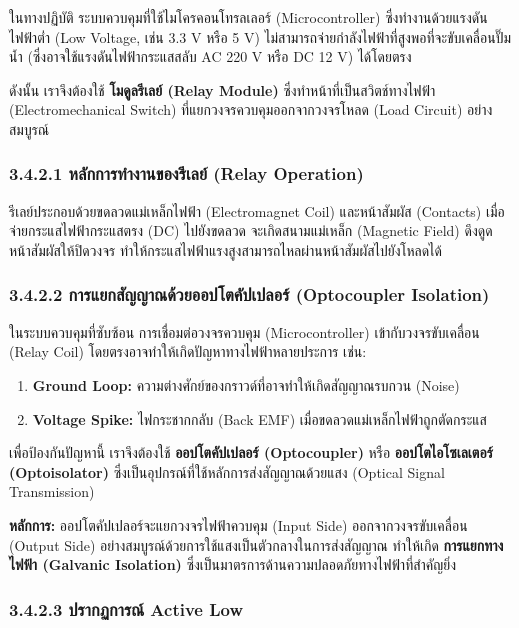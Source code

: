 \documentclass[11pt,a4paper,openany]{report}
\begin{document}
ในทางปฏิบัติ ระบบควบคุมที่ใช้ไมโครคอนโทรลเลอร์ (Microcontroller) ซึ่งทำงานด้วยแรงดันไฟฟ้าต่ำ (Low Voltage, เช่น 3.3 V หรือ 5 V) ไม่สามารถจ่ายกำลังไฟฟ้าที่สูงพอที่จะขับเคลื่อนปั๊มน้ำ (ซึ่งอาจใช้แรงดันไฟฟ้ากระแสสลับ AC 220 V หรือ DC 12 V) ได้โดยตรง

ดังนั้น เราจึงต้องใช้ \textbf{โมดูลรีเลย์ (Relay Module)} ซึ่งทำหน้าที่เป็นสวิตช์ทางไฟฟ้า (Electromechanical Switch) ที่แยกวงจรควบคุมออกจากวงจรโหลด (Load Circuit) อย่างสมบูรณ์

\subsubsection{3.4.2.1 หลักการทำงานของรีเลย์ (Relay Operation)}


รีเลย์ประกอบด้วยขดลวดแม่เหล็กไฟฟ้า (Electromagnet Coil) และหน้าสัมผัส (Contacts) เมื่อจ่ายกระแสไฟฟ้ากระแสตรง (DC) ไปยังขดลวด จะเกิดสนามแม่เหล็ก (Magnetic Field) ดึงดูดหน้าสัมผัสให้ปิดวงจร ทำให้กระแสไฟฟ้าแรงสูงสามารถไหลผ่านหน้าสัมผัสไปยังโหลดได้

\subsubsection{3.4.2.2 การแยกสัญญาณด้วยออปโตคัปเปลอร์ (Optocoupler Isolation)}


ในระบบควบคุมที่ซับซ้อน การเชื่อมต่อวงจรควบคุม (Microcontroller) เข้ากับวงจรขับเคลื่อน (Relay Coil) โดยตรงอาจทำให้เกิดปัญหาทางไฟฟ้าหลายประการ เช่น:
\begin{enumerate}
  \item \textbf{Ground Loop:} ความต่างศักย์ของกราวด์ที่อาจทำให้เกิดสัญญาณรบกวน (Noise)
  \item \textbf{Voltage Spike:} ไฟกระชากกลับ (Back EMF) เมื่อขดลวดแม่เหล็กไฟฟ้าถูกตัดกระแส
\end{enumerate}


เพื่อป้องกันปัญหานี้ เราจึงต้องใช้ \textbf{ออปโตคัปเปลอร์ (Optocoupler)} หรือ \textbf{ออปโตไอโซเลเตอร์ (Optoisolator)} ซึ่งเป็นอุปกรณ์ที่ใช้หลักการส่งสัญญาณด้วยแสง (Optical Signal Transmission)

\textbf{หลักการ:} ออปโตคัปเปลอร์จะแยกวงจรไฟฟ้าควบคุม (Input Side) ออกจากวงจรขับเคลื่อน (Output Side) อย่างสมบูรณ์ด้วยการใช้แสงเป็นตัวกลางในการส่งสัญญาณ ทำให้เกิด \textbf{การแยกทางไฟฟ้า (Galvanic Isolation)} ซึ่งเป็นมาตรการด้านความปลอดภัยทางไฟฟ้าที่สำคัญยิ่ง

\subsubsection{3.4.2.3 ปรากฏการณ์ Active Low}
\end{document}
